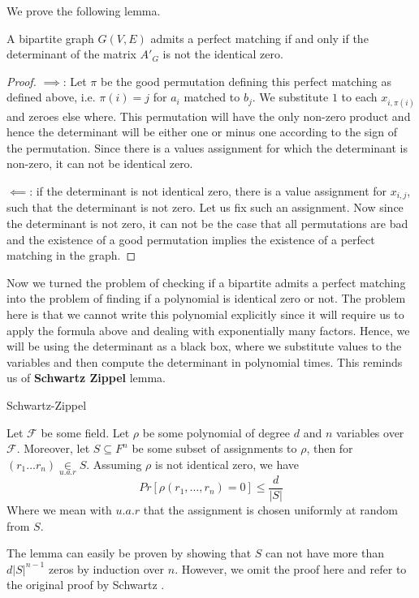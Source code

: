 	We prove the following lemma.
	\begin{lemma}
		A bipartite graph $G(V, E)$ admits a perfect matching if and only if the determinant of the matrix $A'_G$ is not the identical zero.
	\end{lemma}
	\begin{proof}
		$\implies$: Let $\pi$ be the good permutation defining this perfect matching as defined above, i.e. $\pi(i) = j$ for $a_i$ matched to $b_j$. We substitute $1$ to each $x_{i, \pi(i)}$ and zeroes else where. This permutation will have the only non-zero product and hence the determinant will be either one or minus one according to the sign of the permutation. Since there is a values assignment for which the determinant is non-zero, it can not be identical zero.

		$\impliedby$: if the determinant is not identical zero, there is a value assignment for $x_{i, j}$, such that the determinant is not zero. Let us fix such an assignment. Now since the determinant is not zero, it can not be the case that all permutations are bad and the existence of a good permutation implies the existence of a perfect matching in the graph. 
	\end{proof}

	Now we turned the problem of checking if a bipartite admits a perfect matching into the problem of finding if a polynomial is identical zero or not. The problem here is that we cannot write this polynomial explicitly since it will require us to apply the formula above and dealing with exponentially many factors. Hence, we will be using the determinant as a black box, where we substitute values to the variables and then compute the determinant in polynomial times. This reminds us of \textbf{Schwartz Zippel} lemma.


	\begin{lemma}
		Schwartz-Zippel

		Let $\mathcal{F}$ be some field. Let $\rho$ be some polynomial of degree $d$ and $n$ variables over $\mathcal{F}$. Moreover, let $S \subseteq F^{n}$ be some subset of assignments to $\rho$, then for $(r_1 \dots r_n) \underset{u.a.r}{\in}S$. Assuming $\rho$ is not identical zero, we have
		$$Pr\left[\rho(r_1, \dots, r_n) = 0\right] \leq \frac{d}{|S|}$$
		Where we mean with $u.a.r$ that the assignment is chosen uniformly at random from $S$.
	\end{lemma}
	The lemma can easily be proven by showing that $S$ can not have more than $d |S|^{n-1}$ zeros by induction over $n$. However, we omit the proof here and refer to the original proof by Schwartz \cite{schwartz1979probabilistic}.

